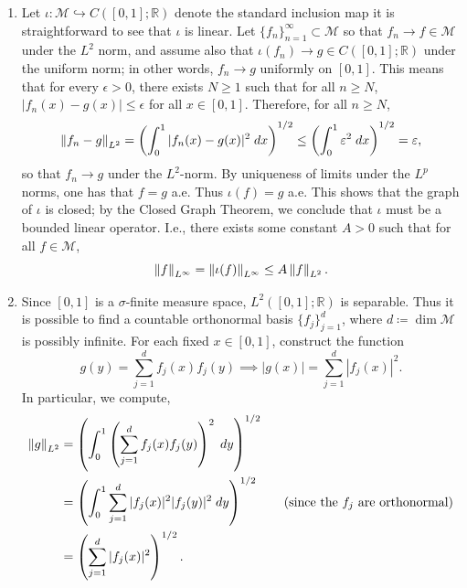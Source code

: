 \documentclass{article}
\begin{document}
	\begin{enumerate}[itemsep =-2pt,label = (\alph{*})]
		\item Let $\iota: \mathcal{M} \hookrightarrow C([0,1]; \mathbb{R})$ denote the standard inclusion map it is straightforward to see that $\iota$ is linear. Let $\{f_{n}\}_{n= 1}^{\infty} \subset \mathcal{M}$ so that $f_{n} \to f \in \mathcal{M}$ under the $L^2$ norm, and assume also that $\iota(f_{n}) \to g \in C([0,1]; \mathbb{R})$ under the uniform norm; in other words, $f_{n} \to g$ uniformly on $[0,1]$. This means that for every $\epsilon > 0$, there exists $N \geq 1$ such that for all $n \geq N$, $|f_{n}(x) - g(x)| \leq \epsilon$ for all $x \in [0,1]$. Therefore, for all $n \geq N$, 
		\begin{equation*}
			\left\Vert f_{n} - g \right\Vert_{L^2} = \left(\int_{0}^{1}|f_{n}(x) - g(x)|^2\;dx\right)^{1/2} \leq \left(\int_{0}^{1}\varepsilon^{2}\;dx\right)^{1/2} = \varepsilon, 
		\end{equation*} 
		so that $f_{n} \to g$ under the $L^2$-norm. By uniqueness of limits under the $L^p$ norms, one has that $f = g$ a.e. Thus $\iota(f) = g$ a.e. This shows that the graph of $\iota$ is closed; by the Closed Graph Theorem, we conclude that $\iota$ must be a bounded linear operator. I.e., there exists some constant $A > 0$ such that for all $f \in \mathcal{M}$, 
		\begin{equation*}
			\left\Vert f \right\Vert_{L^\infty} = \left\Vert \iota(f) \right\Vert_{L^\infty} \leq A \left\Vert f \right\Vert_{L^2}. 
		\end{equation*}
		\item Since $[0,1]$ is a $\sigma$-finite measure space, $L^{2}([0,1]; \mathbb{R})$ is separable. Thus it is possible to find a countable orthonormal basis $\{f_{j}\}_{j = 1}^{d}$, where $d \coloneqq \dim{\mathcal{M}}$ is possibly infinite. For each fixed $x \in [0,1]$, construct the function 
		\begin{equation*}
			g(y) = \sum_{j = 1}^{d}f_{j}(x)f_{j}(y) \implies |g(x)| = \sum_{j = 1}^{d}|f_{j}(x)|^2. 
		\end{equation*}
		In particular, we compute, 
		\begin{align*}
			\begin{split}
				\norm{g}_{L^2} &= \left(\int_{0}^{1}\left(\sum_{j = 1}^{d}f_{j}(x)f_{j}(y)\right)^{2}\;dy\right)^{1/2} \\
				&= \left(\int_{0}^{1}\sum_{j = 1}^{d}|f_{j}(x)|^2|f_{j}(y)|^2\;dy\right)^{1/2} \qquad (\text{since the $f_{j}$ are orthonormal}) \\
				&= \left(\sum_{j = 1}^{d}|f_{j}(x)|^2\right)^{1/2}. 

\end{split}
\end{align*}
\end{enumerate}
\end{document}
